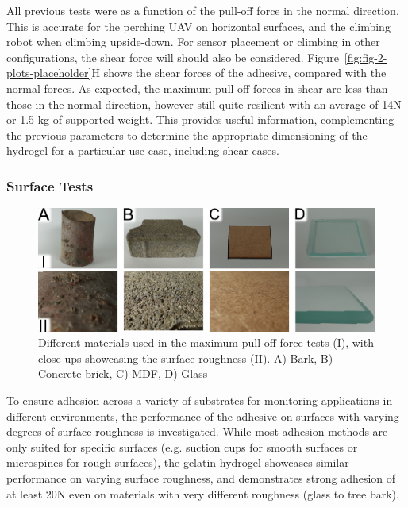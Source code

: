 All previous tests were as a function of the pull-off force in the normal direction. This is accurate for the perching UAV on horizontal surfaces, and the climbing robot when climbing upside-down. For sensor placement or climbing in other configurations, the shear force will should also be considered. Figure~\ref{fig:fig-2-plots-placeholder}H shows the shear forces of the adhesive, compared with the normal forces. As expected, the maximum pull-off forces in shear are less than those in the normal direction, however still quite resilient with an average of 14N or 1.5 kg of supported weight. This provides useful information, complementing the previous parameters to determine the appropriate dimensioning of the hydrogel for a particular use-case, including shear cases.


\subsubsection{Surface Tests} %
\label{subsec:surface_tests}
\begin{figure}
  \includegraphics[width=\linewidth]{figures/fig-3-surfaces-placeholder/fig-3-surfaces.pdf}
  \caption{Different materials used in the maximum pull-off force tests (I), with close-ups showcasing the surface roughness (II). A) Bark, B) Concrete brick, C) MDF, D) Glass}
  \label{fig:fig3-placeholder}
\end{figure}

To ensure adhesion across a variety of substrates for monitoring applications in different environments, the performance of the adhesive on surfaces with varying degrees of surface roughness is investigated. While most adhesion methods are only suited for specific surfaces (e.g. suction cups for smooth surfaces or microspines for rough surfaces), the gelatin hydrogel showcases similar performance on varying surface roughness, and demonstrates strong adhesion of at least 20N even on materials with very different roughness (glass to tree bark).

